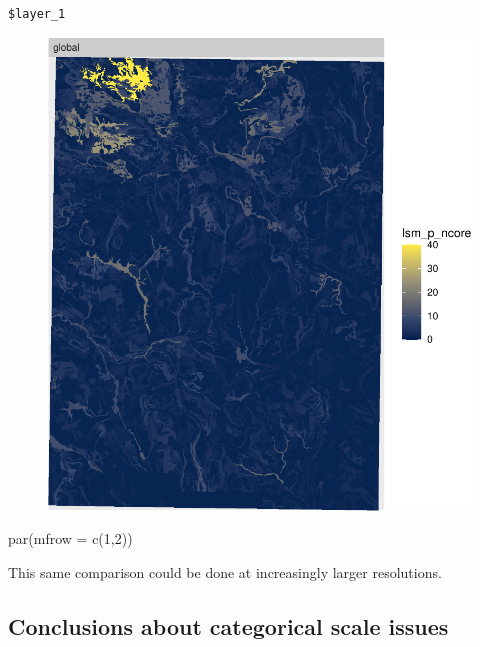 \documentclass[
  letterpaper,
  DIV=11,
  numbers=noendperiod]{scrartcl}
\newenvironment{Shaded}{\begin{snugshade}}{\end{snugshade}}
\newcommand{\AttributeTok}[1]{\textcolor[rgb]{0.40,0.45,0.13}{#1}}
\newcommand{\DecValTok}[1]{\textcolor[rgb]{0.68,0.00,0.00}{#1}}
\newcommand{\FunctionTok}[1]{\textcolor[rgb]{0.28,0.35,0.67}{#1}}
\newcommand{\NormalTok}[1]{\textcolor[rgb]{0.00,0.23,0.31}{#1}}
\begin{document}
\begin{verbatim}
$layer_1
\end{verbatim}

\begin{figure}[H]

{\centering \includegraphics{PatternAnalysisWorkshopTutorial_files/figure-pdf/cores-general-2.pdf}

}

\end{figure}

\begin{Shaded}
\begin{Highlighting}[]
\FunctionTok{par}\NormalTok{(}\AttributeTok{mfrow =} \FunctionTok{c}\NormalTok{(}\DecValTok{1}\NormalTok{,}\DecValTok{2}\NormalTok{))}
\end{Highlighting}
\end{Shaded}

This same comparison could be done at increasingly larger resolutions.

\hypertarget{conclusions-about-categorical-scale-issues}{%
\subsection{Conclusions about categorical scale
issues}\label{conclusions-about-categorical-scale-issues}}
\end{document}
